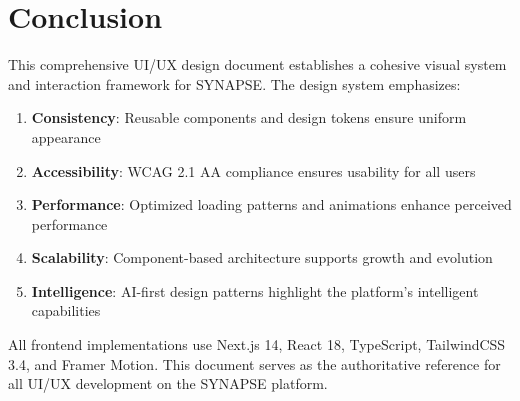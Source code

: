 \documentclass{report}
\begin{document}
\chapter{Conclusion}

This comprehensive UI/UX design document establishes a cohesive visual system and interaction framework for SYNAPSE. The design system emphasizes:

\begin{enumerate}
    \item \textbf{Consistency}: Reusable components and design tokens ensure uniform appearance
    \item \textbf{Accessibility}: WCAG 2.1 AA compliance ensures usability for all users
    \item \textbf{Performance}: Optimized loading patterns and animations enhance perceived performance
    \item \textbf{Scalability}: Component-based architecture supports growth and evolution
    \item \textbf{Intelligence}: AI-first design patterns highlight the platform's intelligent capabilities
\end{enumerate}

All frontend implementations use Next.js 14, React 18, TypeScript, TailwindCSS 3.4, and Framer Motion. This document serves as the authoritative reference for all UI/UX development on the SYNAPSE platform.
\end{document}

